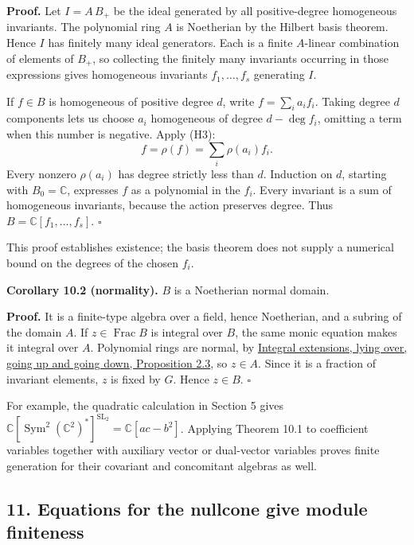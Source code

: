 \documentclass[
]{article}
\begin{document}
\textbf{Proof.} Let \(I=A\,B_+\) be the ideal generated by all
positive-degree homogeneous invariants. The polynomial ring \(A\) is
Noetherian by the Hilbert basis theorem. Hence \(I\) has finitely many
ideal generators. Each is a finite \(A\)-linear combination of elements
of \(B_+\), so collecting the finitely many invariants occurring in
those expressions gives homogeneous invariants \(f_1,\ldots,f_s\)
generating \(I\).

If \(f\in B\) is homogeneous of positive degree \(d\), write
\(f=\sum_i a_if_i\). Taking degree \(d\) components lets us choose
\(a_i\) homogeneous of degree \(d-\deg f_i\), omitting a term when this
number is negative. Apply (H3): \[
f=\rho(f)=\sum_i\rho(a_i)f_i.
\] Every nonzero \(\rho(a_i)\) has degree strictly less than \(d\).
Induction on \(d\), starting with \(B_0=\mathbb C\), expresses \(f\) as
a polynomial in the \(f_i\). Every invariant is a sum of homogeneous
invariants, because the action preserves degree. Thus
\(B=\mathbb C [f_1,\ldots,f_s]\). \(\square\)

This proof establishes existence; the basis theorem does not supply a
numerical bound on the degrees of the chosen \(f_i\).

\protect{}\label{corollary-10-2}{}

\textbf{Corollary 10.2 (normality).} \(B\) is a Noetherian normal
domain.

\textbf{Proof.} It is a finite-type algebra over a field, hence
Noetherian, and a subring of the domain \(A\). If
\(z\in\operatorname{Frac}B\) is integral over \(B\), the same monic
equation makes it integral over \(A\). Polynomial rings are normal, by
\href{../AG-CA/AG-CA-05.html\#2-integral-closure-survives-localization}{Integral
extensions, lying over, going up and going down, Proposition 2.3}, so
\(z\in A\). Since it is a fraction of invariant elements, \(z\) is fixed
by \(G\). Hence \(z\in B\). \(\square\)

For example, the quadratic calculation in Section 5 gives
\(\mathbb C [\operatorname{Sym}^2(\mathbb C^2)^*]^{\operatorname{SL}_2}
=\mathbb C [ac-b^2]\). Applying Theorem 10.1 to coefficient variables
together with auxiliary vector or dual-vector variables proves finite
generation for their covariant and concomitant algebras as well.

\subsection{11. Equations for the nullcone give module
finiteness}\label{section-11}
\end{document}
